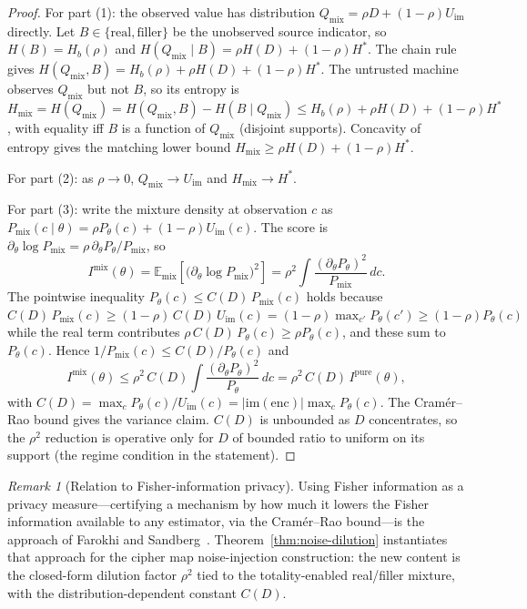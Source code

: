 \documentclass[11pt]{article}
\theoremstyle{definition}
\theoremstyle{plain}
\theoremstyle{remark}
\newtheorem{remark}{Remark}[section]
\newcommand{\enc}{\mathrm{enc}}
\begin{document}
\begin{proof}
For part (1): the observed value has distribution
$Q_{\mathrm{mix}} = \rho D + (1-\rho) U_{\mathrm{im}}$ directly.  Let
$B \in \{\text{real},\text{filler}\}$ be the unobserved source indicator,
so $H(B) = H_b(\rho)$ and
$H(Q_{\mathrm{mix}} \mid B) = \rho H(D) + (1-\rho) H^*$.  The chain rule
gives $H(Q_{\mathrm{mix}}, B) = H_b(\rho) + \rho H(D) + (1-\rho) H^*$.
The untrusted machine observes $Q_{\mathrm{mix}}$ but not $B$, so its
entropy is $H_{\mathrm{mix}} = H(Q_{\mathrm{mix}}) = H(Q_{\mathrm{mix}}, B)
- H(B \mid Q_{\mathrm{mix}}) \leq H_b(\rho) + \rho H(D) + (1-\rho) H^*$,
with equality iff $B$ is a function of $Q_{\mathrm{mix}}$ (disjoint
supports).  Concavity of entropy gives the matching lower bound
$H_{\mathrm{mix}} \geq \rho H(D) + (1-\rho) H^*$.

For part (2): as $\rho \to 0$, $Q_{\mathrm{mix}} \to U_{\mathrm{im}}$ and
$H_{\mathrm{mix}} \to H^*$.

For part (3): write the mixture density at observation $c$ as
$P_{\mathrm{mix}}(c \mid \theta) = \rho P_\theta(c) +
(1 - \rho) U_{\mathrm{im}}(c)$.  The score is
$\partial_\theta \log P_{\mathrm{mix}} =
\rho\,\partial_\theta P_\theta / P_{\mathrm{mix}}$, so
\[
I^{\mathrm{mix}}(\theta)
  = \mathbb{E}_{\mathrm{mix}}\!\left[\bigl(\partial_\theta \log P_{\mathrm{mix}}\bigr)^2\right]
  = \rho^2 \int \frac{(\partial_\theta P_\theta)^2}{P_{\mathrm{mix}}}\,dc.
\]
The pointwise inequality $P_\theta(c) \leq C(D)\,P_{\mathrm{mix}}(c)$
holds because $C(D)\,P_{\mathrm{mix}}(c) \geq (1-\rho)\,C(D)\,
U_{\mathrm{im}}(c) = (1-\rho)\max_{c'} P_\theta(c') \geq (1-\rho)
P_\theta(c)$ while the real term contributes
$\rho\,C(D)\,P_\theta(c) \geq \rho P_\theta(c)$, and these sum to
$P_\theta(c)$.  Hence $1/P_{\mathrm{mix}}(c) \leq C(D)/P_\theta(c)$ and
\[
I^{\mathrm{mix}}(\theta)
  \leq \rho^2\,C(D) \int \frac{(\partial_\theta P_\theta)^2}{P_\theta}\,dc
  = \rho^2\,C(D)\,I^{\mathrm{pure}}(\theta),
\]
with $C(D) = \max_c P_\theta(c) / U_{\mathrm{im}}(c) =
|\mathrm{im}(\enc)| \max_c P_\theta(c)$.  The Cram\'er--Rao bound gives
the variance claim.  $C(D)$ is unbounded as $D$ concentrates, so the
$\rho^2$ reduction is operative only for $D$ of bounded ratio to uniform
on its support (the regime condition in the statement).
\end{proof}

\begin{remark}[Relation to Fisher-information privacy]
Using Fisher information as a privacy measure---certifying a mechanism by
how much it lowers the Fisher information available to any estimator, via
the Cram\'er--Rao bound---is the approach of Farokhi and
Sandberg~\cite{farokhi2019ensuring}.  Theorem~\ref{thm:noise-dilution}
instantiates that approach for the cipher map noise-injection construction:
the new content is the closed-form dilution factor $\rho^2$ tied to the
totality-enabled real/filler mixture, with the distribution-dependent
constant $C(D)$.
\end{remark}
\end{document}
